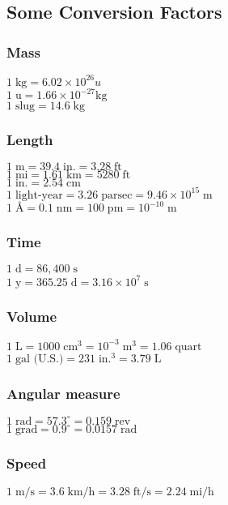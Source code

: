 \documentclass[../PhysicsFormulae.tex]{subfiles}
\begin{document}
\subsection{Some Conversion Factors}
\subsubsection{Mass}
$1 \; \textrm{kg} = 6.02 \times 10^{26} u$\\
$1 \; \textrm{u} = 1.66 \times 10^{-27} \textrm{kg}$\\
$1 \; \textrm{slug} = 14.6 \; \textrm{kg}$

\subsubsection{Length}
$1 \; \textrm{m} = 39.4 \; \textrm{in.} = 3.28 \; \textrm{ft}$\\
$1 \; \textrm{mi} = 1.61 \; \textrm{km} = 5280 \; \textrm{ft}$\\
$1 \; \textrm{in.} = 2.54 \; \textrm{cm}$\\
$1 \; \textrm{light-year} = 3.26 \; \textrm{parsec} = 9.46 \times 10^{15} \; \textrm{m}$\\
$1 \; \textrm{\AA} = 0.1 \; \textrm{nm} = 100 \; \textrm{pm} = 10^{-10} \; \textrm{m}$

\subsubsection{Time}
$1 \; \textrm{d} = 86,400 \; \textrm{s}$\\
$1 \; \textrm{y} = 365.25 \; \textrm{d} = 3.16 \times 10^{7} \; \textrm{s}$

\subsubsection{Volume}
$1 \; \textrm{L} = 1000 \; \textrm{cm}^3 = 10^{-3} \; \textrm{m}^3 = 1.06 \; \textrm{quart}$\\
$1 \; \textrm{gal (U.S.)} = 231 \; \textrm{in.}^3 = 3.79 \; \textrm{L}$

\subsubsection{Angular measure}
$1 \; \textrm{rad} = 57.3^{\circ} = 0.159 \; \textrm{rev}$\\
$1 \; \textrm{grad} = 0.9^{\circ} = 0.0157 \; \textrm{rad}$

\subsubsection{Speed}
$1 \; \textrm{m/s} = 3.6 \; \textrm{km/h} = 3.28 \; \textrm{ft/s} = 2.24 \; \textrm{mi/h}$
\end{document}
